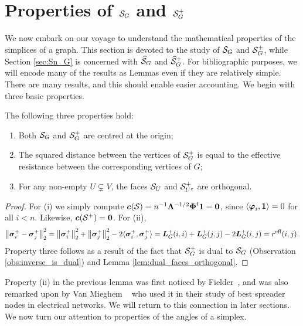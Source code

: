  



\section{Properties of \texorpdfstring{$\mathcal{S}_G$}{the Combinatorial Simplex} and \texorpdfstring{$\mathcal{S}_G^+$}{its inverse}}
\label{sec:S_G}
We now embark on our voyage to understand the mathematical properties of the simplices of a graph. This section is devoted to the study of $\mathcal{S}_G$ and $\mathcal{S}_G^+$, while Section \ref{sec:Sn_G} is concerned with $\widehat{\mathcal{S}}_G$ and $\widehat{\mathcal{S}}_G^+$. For bibliographic purposes, we will encode many of the results as Lemmas even if they are relatively simple. There are many results, and this should enable easier accounting. We begin with three basic properties.

\begin{lemma}
	\label{lem:S_G_basic_properties}
	The following three properties hold: 
	\begin{enumerate}
		\item 	Both $\mathcal{S}_G$ and $\mathcal{S}_G^+$ are centred at the origin;
		\item The squared distance between the vertices of $\mathcal{S}_G^+$ is equal to the effective resistance between the corresponding vertices of $G$; 
		\item For any non-empty $U\subsetneq V$, the faces $\mathcal{S}_U$ and $\mathcal{S}^+_{U^c}$ are orthogonal. 
	\end{enumerate}
\end{lemma}
\begin{proof}
	For (i) we  simply compute $\vb*{c}(\mathcal{S}) = n^{-1}\vb{\Lambda}^{-1/2}\boldsymbol{\Phi}^t \vb{1} =\vb{0}$, since $\langle \vb*{\varphi}_i,\vb{1}\rangle =0$ for all $i<n$.  Likewise, $\vb*{c}(\mathcal{S}^+)=\vb{0}$. For (ii), 
	\begin{equation*}
	\norm{\vb*{\sigma}_i^+-\vb*{\sigma}_j^+}_2^2 = \norm{\vb*{\sigma}_i^+}_2^2 + \norm{\vb*{\sigma}_j^+}_2^2 - 2\langle \vb*{\sigma}_i^+,\vb*{\sigma}_j^+\rangle = \vb*{L}_G^+(i,i) + \vb*{L}_G^+(j,j) - 2\vb*{L}_G^+(i,j) = r^{\text{eff}}(i,j).
	\end{equation*}
	Property three follows as a result of the fact that $\mathcal{S}_G^+$ is dual to $\mathcal{S}_G$ (Observation \ref{obs:inverse_is_dual}) and Lemma \ref{lem:dual_faces_orthogonal}. 
\end{proof}




Property (ii) in the previous lemma was first noticed by Fielder~\cite[Chapter 6]{fiedler2011matrices}, and was also remarked upon by Van Mieghem \etal~\cite{van2017pseudoinverse} who used it in their study of best spreader nodes in electrical networks. We will return to this connection in later sections. We now turn our attention to properties of the angles of a simplex.  

